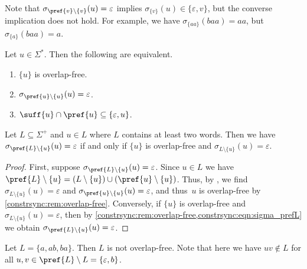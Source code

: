 \begin{remark}
	Note that $\sigma_{\pref{v}\setminus\{v\}}(u) = \varepsilon$
	implies $\sigma_{\{v\}}(u) \in \{\varepsilon, v\}$,
	but the converse implication does not hold. For example, 
	we have $\sigma_{\{aa\}}(baa) = aa$, but $\sigma_{\{a\}}(baa) = a$.
\end{remark} 

\begin{corollary} \label{constrsync:rem:overlap-free}
	Let $u \in \Sigma^*$. Then the following are equivalent.
	\begin{enumerate}
	\item $\{u\}$ is overlap-free.
	
	\item $\sigma_{\pref{u}\setminus\{u\}}(u) = \varepsilon$.
	
	\item $\suff{u}\cap \pref{u} \subseteq \{\varepsilon, u\}$.
	\end{enumerate}
\end{corollary}

\begin{proposition} \label{constr_sync:cor:sigma_L_prefix-eps}
	Let $L \subseteq \Sigma^+$ and $u \in L$ where $L$ contains at least two words.
	Then we have $\sigma_{\pref{L} \setminus \{u\}}(u) = \varepsilon$
	if and only if $\{u\}$ is overlap-free and $\sigma_{L \setminus \{u\}}(u) = \varepsilon$.
\end{proposition}
\begin{proof}
	First, suppose $\sigma_{\pref{L} \setminus \{u\}}(u) = \varepsilon$.
	Since $u \in L$ we have $\pref{L}\setminus \{u\} = ( L \setminus \{u\} ) \cup ( \pref{u} \setminus \{u\})$.
	Thus, by ,
	we find $\sigma_{L \setminus\{u\}}(u) = \varepsilon$
	and $\sigma_{\pref{u}\setminus\{u\}}(u) = \varepsilon$, and thus~$u$ is overlap-free by \cref{constrsync:rem:overlap-free}.
	Conversely, if $\{u\}$ is overlap-free and $\sigma_{L\setminus\{u\}}(u) = \varepsilon$,
	then by \cref{constrsync:rem:overlap-free,constrsync:eqn:sigma_prefL} 
	we obtain $\sigma_{\pref{L} \setminus \{u\}}(u) = \varepsilon$.
\end{proof}

\begin{example}
	Let $L = \{a, ab,ba\}$. Then $L$ is not overlap-free. 
	Note that here we have $uv \notin L$ for all $u,v \in \pref{L} \setminus L = \{\varepsilon, b\}$.
\end{example}

